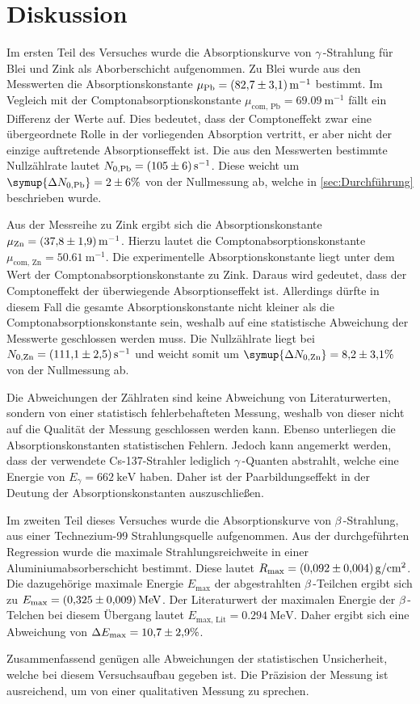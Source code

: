 \section{Diskussion}
\label{sec:Diskussion}
Im ersten Teil des Versuches wurde die Absorptionskurve von $\gamma$\,-Strahlung für Blei und Zink als Aborberschicht aufgenommen.
Zu Blei wurde aus den Messwerten die Absorptionskonstante 
$\mu_\text{Pb} = \qty{82.7 +- 3.1}{\metre^{-1}}$ bestimmt. Im Vegleich mit der Comptonabsorptionskonstante $\mu_\text{com, Pb} = \qty{69.09}{\metre^{-1}}$ fällt ein Differenz der Werte auf.
Dies bedeutet, dass der Comptoneffekt zwar eine übergeordnete Rolle in der vorliegenden Absorption vertritt, er aber nicht der einzige auftretende Absorptionseffekt ist.
Die aus den Messwerten bestimmte Nullzählrate lautet $N_{0, \text{Pb}} = \qty{105 +- 6}{\second^{-1}}$. Diese weicht um $\symup{\Delta N_{0, \text{Pb}}} = \num{2 +- 6}\%$
von der Nullmessung ab, welche in \autoref{sec:Durchführung} beschrieben wurde.

Aus der Messreihe zu Zink ergibt sich die Absorptionskonstante $\mu_{\text{Zn}} = \qty{37.8 +- 1.9}{\metre^{-1}}$. Hierzu lautet die Comptonabsorptionskonstante 
$\mu_{\text{com, Zn}} = \qty{50.61}{\metre^{-1}}$. Die experimentelle Absorptionskonstante liegt unter dem Wert der Comptonabsorptionskonstante zu Zink. Daraus wird gedeutet, 
dass der Comptoneffekt der überwiegende Absorptionseffekt ist. Allerdings dürfte in diesem Fall die gesamte Absorptionskonstante nicht kleiner als die Comptonabsorptionskonstante 
sein, weshalb auf eine statistische Abweichung der Messwerte geschlossen werden muss. 
Die Nullzählrate liegt bei $N_{0, \text{Zn}} = \qty{111.1 +- 2.5}{\second^{-1}}$ und weicht somit um $\symup{\Delta N_{0, \text{Zn}}} = \num{8.2 +- 3.1}\%$ von der Nullmessung ab.

Die Abweichungen der Zählraten sind keine Abweichung von Literaturwerten, sondern von einer statistisch fehlerbehafteten Messung, weshalb von dieser nicht auf die Qualität der
Messung geschlossen werden kann. Ebenso unterliegen die Absorptionskonstanten statistischen Fehlern. 
Jedoch kann angemerkt werden, dass der verwendete Cs-137-Strahler lediglich $\gamma$\,-Quanten abstrahlt, welche eine Energie von $E_\gamma = \qty{662}{\kilo\electronvolt}$
\cite{physikalischesGrundpraktikum} haben. Daher ist der Paarbildungseffekt in der Deutung der Absorptionskonstanten auszuschließen.

Im zweiten Teil dieses Versuches wurde die Absorptionskurve von $\beta$\,-Strahlung, aus einer Technezium-99 Strahlungsquelle aufgenommen. Aus der durchgeführten 
Regression wurde die maximale Strahlungsreichweite in einer Aluminiumabsorberschicht bestimmt. Diese lautet $R_\text{max} = \qty{0.092 +- 0.004}{\gram\per\centi\metre\squared}$. 
Die dazugehörige maximale Energie $E_\text{max}$ der abgestrahlten $\beta$\,-Teilchen ergibt sich zu $E_\text{max} = \qty{0.325 +- 0.009}{\mega\electronvolt}$. Der Literaturwert
der maximalen Energie der $\beta$\,-Telchen bei diesem Übergang lautet $E_{\text{max, Lit}} = \qty{0.294}{\mega\electronvolt}$. Daher ergibt sich eine Abweichung von
$\Delta E_\text{max} = \num{10.7 +- 2.9}\%$. 

Zusammenfassend genügen alle Abweichungen der statistischen Unsicherheit, welche bei diesem Versuchsaufbau gegeben ist. Die Präzision der Messung ist ausreichend, um 
von einer qualitativen Messung zu sprechen.